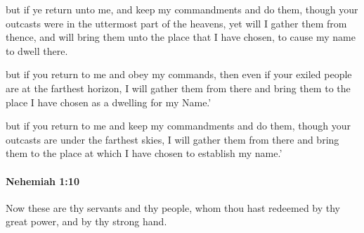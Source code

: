 			\begin{versebox}
					\item[BHS] 
					\item[LXX] 
					\item[ASV] but if ye return unto me, and keep my commandments and do them, though your outcasts were in the uttermost part of the heavens, yet will I gather them from thence, and will bring them unto the place that I have chosen, to cause my name to dwell there.
					\item[NIV] but if you return to me and obey my commands, then even if your exiled people are at the farthest horizon, I will gather them from there and bring them to the place I have chosen as a dwelling for my Name.’
					\item[NRSV] but if you return to me and keep my commandments and do them, though your outcasts are under the farthest skies, I will gather them from there and bring them to the place at which I have chosen to establish my name.’
			\end{versebox}

		\paragraph{Nehemiah 1:10} %
			\label{NEHEMIAH-1-10}

			Now these are thy servants and thy people, whom thou hast redeemed by thy great power, and by thy strong hand.


